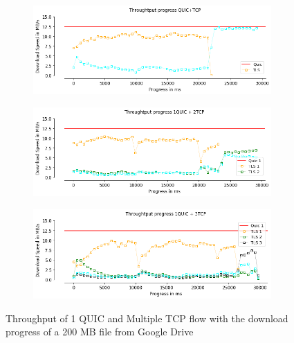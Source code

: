 \begin{frame}
\begin{figure}[!htb]
    \begin{subfigure}{0.5\textwidth}
        \includegraphics[width=\linewidth]{./plots/PI/throughput/ThroughtputprogressQUIC+TCP.png}
    \end{subfigure}
    \begin{subfigure}{0.5\textwidth}
        \includegraphics[width=\linewidth]{./plots/PI/throughput/Throughtputprogress1QUIC+2TCP.png}
    \end{subfigure}
%
%
    \begin{subfigure}{0.5\textwidth}
        \includegraphics[width=\linewidth]{./plots/PI/throughput/Throughtputprogress1QUIC+3TCP.png}
    \end{subfigure}    
    \caption{Throughput of 1 QUIC and Multiple TCP flow with the download progress of a 200 MB file from Google Drive}
\end{figure}
\end{frame}
\clearpage

